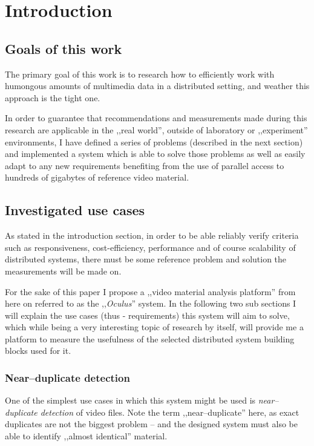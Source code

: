 \chapter{Introduction}



\section{Goals of this work}
The primary goal of this work is to research how to efficiently work with humongous amounts of multimedia data in a distributed setting, and weather this approach is the tight one.

In order to guarantee that recommendations and measurements made during this research are applicable in the ,,real world'', outside of laboratory or ,,experiment'' environments, I have defined a series of problems (described in the next section) and implemented a system which is able to solve those problems as well as easily adapt to any new requirements benefiting from the use of parallel access to hundreds of gigabytes of reference video material.

\section{Investigated use cases}

As stated in the introduction section, in order to be able reliably verify criteria such as responsiveness, cost-efficiency, performance and of course scalability of distributed systems, there must be some reference problem and solution the measurements will be made on. 

For the sake of this paper I propose a ,,video material analysis platform'' from here on referred to as the ,,\textit{Oculus}'' system.
In the following two sub sections I will explain the use cases (thus - requirements) this system will aim to solve, which while being a very interesting 
topic of research by itself, will provide me a platform to measure the usefulness of the selected distributed system building blocks used for it. 

\subsection{Near--duplicate detection}
One of the simplest use cases in which this system might be used is \textit{near--duplicate detection} of video files.
Note the term ,,near--duplicate'' here, as exact duplicates are not the biggest problem -- and the designed system must also be able to identify ,,almost identical'' material.

